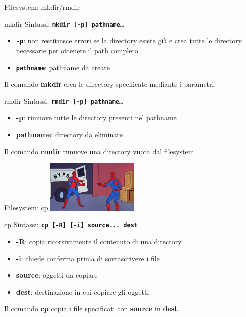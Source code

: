 \documentclass{beamer}
\begin{document}
    \begin{frame}{Filesystem: mkdir/rmdir}
        \begin{block}{mkdir}
            Sintassi: \texttt{\textbf{mkdir [-p] pathname\dots}}

            \begin{itemize}
                \item \texttt{\textbf{-p}}: non restituisce errori se la directory esiste già e crea tutte le directory necessarie per ottenere il path completo
                \item \texttt{\textbf{pathname}}: pathname da creare
            \end{itemize}

            Il comando \textbf{mkdir} crea le directory specificate mediante i parametri.
        \end{block}

        \begin{block}{rmdir}
            Sintassi: \texttt{\textbf{rmdir [-p] pathname\dots}}

            \begin{itemize}
                \item \textbf{-p}: rimuove tutte le directory presenti nel pathname
                \item \textbf{pathname}: directory da eliminare
            \end{itemize}

            Il comando \textbf{rmdir} rimuove una directory vuota dal filesystem.
        \end{block}
    \end{frame}

    \begin{frame}{Filesystem: cp}
        \centering
        \includegraphics[height=2.5cm, keepaspectratio]{images/spider-man-meme.jpg}

        \begin{block}{cp}
            Sintassi: \texttt{\textbf{cp [-R] [-i] source... dest}}

            \begin{itemize}
                \item \textbf{-R}: copia ricorsivamente il contenuto di una directory
                \item \textbf{-i}: chiede conferma prima di sovrascrivere i file
                \item \textbf{source}: oggetti da copiare
                \item \textbf{dest}: destinazione in cui copiare gli oggetti
            \end{itemize}

            Il comando \textbf{cp} copia i file specificati con \textbf{source} in \textbf{dest}.
        \end{block}
    \end{frame}
\end{document}
